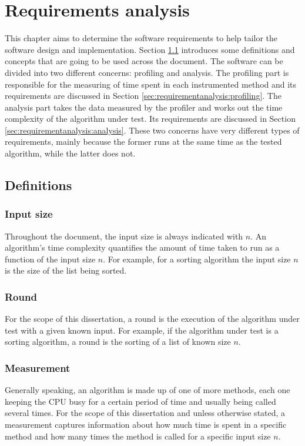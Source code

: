 \chapter{Requirements analysis}

This chapter aims to determine the software requirements to help tailor the software design and implementation. Section \ref{sec:requirementanalysis:definitions} introduces some definitions and concepts that are going to be used across the document. The software can be divided into two different concerns: profiling and analysis. The profiling part is responsible for the measuring of time spent in each instrumented method and its requirements are discussed in Section \ref{sec:requirementanalysis:profiling}. The analysis part takes the data measured by the profiler and works out the time complexity of the algorithm under test. Its requirements are discussed in Section \ref{sec:requirementanalysis:analysis}. These two concerns have very different types of requirements, mainly because the former runs at the same time as the tested algorithm, while the latter does not.

\section{Definitions}
\label{sec:requirementanalysis:definitions}

\subsection{Input size}
Throughout the document, the input size is always indicated with $n$. An algorithm's time complexity quantifies the amount of time taken to run as a function of the input size $n$. For example, for a sorting algorithm the input size $n$ is the size of the list being sorted.

\subsection{Round}
For the scope of this dissertation, a round is the execution of the algorithm under test with a given known input. For example, if the algorithm under test is a sorting algorithm, a round is the sorting of a list of known size $n$.

\subsection{Measurement}
\label{sec:requirementanalysis:definitions:measurement}
Generally speaking, an algorithm is made up of one of more methods, each one keeping the CPU busy for a certain period of time and usually being called several times. For the scope of this dissertation and unless otherwise stated, a measurement captures information about how much time is spent in a specific method and how many times the method is called for a specific input size $n$.

